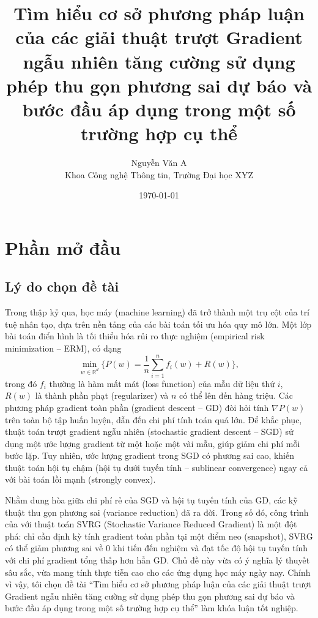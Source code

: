 \documentclass[12pt,a4paper]{report}
\theoremstyle{definition}
\begin{document}
\title{\bf Tìm hiểu cơ sở phương pháp luận của các giải thuật trượt Gradient ngẫu nhiên tăng cường sử dụng phép thu gọn phương sai dự báo và bước đầu áp dụng trong một số trường hợp cụ thể}
\author{Nguyễn Văn A \\ \small Khoa Công nghệ Thông tin, Trường Đại học XYZ}
\date{\today}
\maketitle

\tableofcontents
\listoffigures
\listofalgorithms

\chapter*{Phần mở đầu}

\section*{Lý do chọn đề tài}
Trong thập kỷ qua, học máy (machine learning) đã trở thành một trụ cột của trí tuệ nhân tạo, dựa trên nền tảng của các bài toán tối ưu hóa quy mô lớn. Một lớp bài toán điển hình là tối thiểu hóa rủi ro thực nghiệm (empirical risk minimization – ERM), có dạng
\begin{equation}
\min_{w \in \mathbb{R}^d} \Big\{ P(w) = \frac{1}{n}\sum_{i=1}^{n} f_i(w) + R(w) \Big\},
\end{equation}
trong đó $f_i$ thường là hàm mất mát (loss function) của mẫu dữ liệu thứ $i$, $R(w)$ là thành phần phạt (regularizer) và $n$ có thể lên đến hàng triệu. Các phương pháp gradient toàn phần (gradient descent – GD) đòi hỏi tính $\nabla P(w)$ trên toàn bộ tập huấn luyện, dẫn đến chi phí tính toán quá lớn. Để khắc phục, thuật toán trượt gradient ngẫu nhiên (stochastic gradient descent – SGD) sử dụng một ước lượng gradient từ một hoặc một vài mẫu, giúp giảm chi phí mỗi bước lặp. Tuy nhiên, ước lượng gradient trong SGD có phương sai cao, khiến thuật toán hội tụ chậm (hội tụ dưới tuyến tính – sublinear convergence) ngay cả với bài toán lồi mạnh (strongly convex).

Nhằm dung hòa giữa chi phí rẻ của SGD và hội tụ tuyến tính của GD, các kỹ thuật thu gọn phương sai (variance reduction) đã ra đời. Trong số đó, công trình của \citet{johnson2013accelerating} với thuật toán SVRG (Stochastic Variance Reduced Gradient) là một đột phá: chỉ cần định kỳ tính gradient toàn phần tại một điểm neo (snapshot), SVRG có thể giảm phương sai về 0 khi tiến đến nghiệm và đạt tốc độ hội tụ tuyến tính với chi phí gradient tổng thấp hơn hẳn GD. Chủ đề này vừa có ý nghĩa lý thuyết sâu sắc, vừa mang tính thực tiễn cao cho các ứng dụng học máy ngày nay. Chính vì vậy, tôi chọn đề tài “Tìm hiểu cơ sở phương pháp luận của các giải thuật trượt Gradient ngẫu nhiên tăng cường sử dụng phép thu gọn phương sai dự báo và bước đầu áp dụng trong một số trường hợp cụ thể” làm khóa luận tốt nghiệp.
\end{document}
